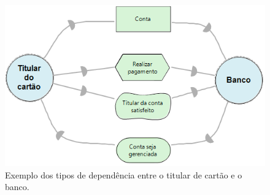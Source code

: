 \begin{figure}[h!]
	\centering
	\includegraphics[keepaspectratio=true,scale=1.0]{figuras/ExemploTiposDeDependecias.PNG}
	\caption{Exemplo dos tipos de dependência entre o titular de cartão e o banco.}
	\label{exemploTipoDeDepencia}
\end{figure} 

